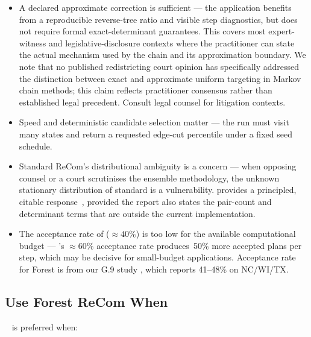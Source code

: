 \begin{itemize}
  \item A declared approximate correction is sufficient --- the application
        benefits from a reproducible reverse-tree ratio and visible step
        diagnostics, but does not require formal exact-determinant guarantees.
        This covers most expert-witness and legislative-disclosure contexts
        where the practitioner can state the actual mechanism used by the
        chain and its approximation boundary.
        We note that no published redistricting court opinion has
        specifically addressed the distinction between exact and approximate
        uniform targeting in Markov chain methods; this claim reflects
        practitioner consensus rather than established legal precedent.
        Consult legal counsel for litigation contexts.

  \item Speed and deterministic candidate selection matter --- the run must
        visit many states and return a requested edge-cut percentile under a
        fixed seed schedule.

  \item Standard ReCom's distributional ambiguity is a concern --- when
        opposing counsel or a court scrutinises the ensemble methodology,
        the unknown stationary distribution of standard \recom{} is a
        vulnerability.
        \mergesplit{} provides a principled, citable response~\citep{janson2022},
        provided the report also states the pair-count and determinant terms
        that are outside the current implementation.

  \item The acceptance rate of \forestrecom{} ($\approx\!40\%$) is too
        low for the available computational budget --- \mergesplit{}'s
        $\approx\!60\%$ acceptance rate produces~50\% more accepted plans
        per step, which may be decisive for small-budget applications.
        Acceptance rate for Forest \recom{} is from our G.9 study
        \citep{dellaLibera2026forestRecom}, which reports 41--48\% on
        NC/WI/TX.
\end{itemize}

\subsection{Use Forest ReCom When}

\forestrecom{}~\citep{dellaLibera2026forestRecom} is preferred when:


